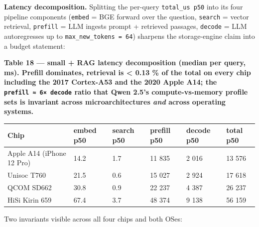 \textbf{Latency decomposition.} Splitting the per-query \texttt{total\_us\ p50}
into its four pipeline components (\texttt{embed} = BGE forward over the
question, \texttt{search} = vector retrieval, \texttt{prefill} = LLM ingests
prompt + retrieved passages, \texttt{decode} = LLM autoregresses up to
\texttt{max\_new\_tokens\ =\ 64}) sharpens the storage-engine claim into a
budget statement:

\textbf{Table 18 --- small + RAG latency decomposition (median per query, ms).
Prefill dominates, retrieval is \textless{} 0.13 \% of the total on every chip
including the 2017 Cortex-A53 and the 2020 Apple A14; the
\texttt{prefill\ ≈\ 6×\ decode} ratio that Qwen 2.5's compute-vs-memory profile
sets is invariant across microarchitectures \emph{and} across operating
systems.}

{\def\LTcaptype{none} %
\begin{longtable}[]{@{}llllll@{}}
\toprule\noalign{}
Chip & embed p50 & search p50 & prefill p50 & decode p50 & total p50 \\
\midrule\noalign{}
\endhead
\bottomrule\noalign{}
\endlastfoot
Apple A14 (iPhone 12 Pro) & 14.2 & 1.7 & 11 835 & 2 016 & 13 576 \\
Unisoc T760 & 21.5 & 0.6 & 15 027 & 2 924 & 17 618 \\
QCOM SD662 & 30.8 & 0.9 & 22 237 & 4 387 & 26 237 \\
HiSi Kirin 659 & 67.4 & 3.7 & 48 374 & 9 138 & 56 159 \\
\end{longtable}
}

Two invariants visible across all four chips and both OSes:

